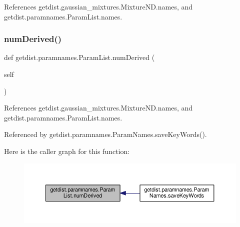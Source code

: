 References getdist.\+gaussian\+\_\+mixtures.\+Mixture\+N\+D.\+names, and getdist.\+paramnames.\+Param\+List.\+names.

\mbox{\label{classgetdist_1_1paramnames_1_1ParamList_ad7152452d0cc010b858c735f69898ee3}} 
\subsubsection{\texorpdfstring{num\+Derived()}{numDerived()}}
{\footnotesize\ttfamily def getdist.\+paramnames.\+Param\+List.\+num\+Derived (\begin{DoxyParamCaption}\item[{}]{self }\end{DoxyParamCaption})}



References getdist.\+gaussian\+\_\+mixtures.\+Mixture\+N\+D.\+names, and getdist.\+paramnames.\+Param\+List.\+names.



Referenced by getdist.\+paramnames.\+Param\+Names.\+save\+Key\+Words().

Here is the caller graph for this function\+:
\nopagebreak
\begin{figure}[H]
\begin{center}
\leavevmode
\includegraphics[width=350pt]{classgetdist_1_1paramnames_1_1ParamList_ad7152452d0cc010b858c735f69898ee3_icgraph}
\end{center}
\end{figure}
\mbox{\label{classgetdist_1_1paramnames_1_1ParamList_aa72f239a49fd8c4070223c225ffc9e92}} 

